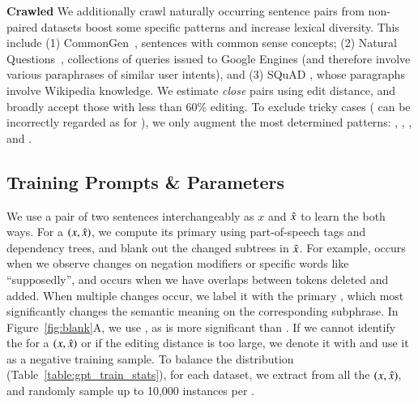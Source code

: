 \textbf{Crawled} 
We additionally crawl naturally occurring sentence pairs from non-paired datasets boost some specific patterns and increase lexical diversity. 
This include 
(1) CommonGen~\cite{lin-etal-2020-commongen}, sentences with common sense concepts; 
(2) Natural Questions~\cite{kwiatkowski-etal-2019-natural}, collections of queries issued to Google Engines (and therefore involve various paraphrases of similar user intents), and 
(3) SQuAD \cite{rajpurkar-etal-2016-squad}, whose paragraphs involve Wikipedia knowledge.
We estimate \emph{close} pairs using edit distance, and broadly accept those with less than 60\% editing.
To exclude tricky cases (\eg {} can be incorrectly regarded as  for ), we only augment the most determined patterns: , , , and .


\subsection{Training Prompts \& Parameters}

We use a pair of two sentences interchangeably as $x$ and $\hat{x}$ to learn the \tagstrs both ways.
For a $(x, \hat{x})$, we compute its primary \tagstr using part-of-speech tags and dependency trees, and blank out the changed subtrees in $\hat{x}$.
For example,  occurs when we observe changes on negation modifiers or specific words like ``supposedly'', and  occurs when we have overlaps between tokens deleted and added.
When multiple changes occur, we label it with the primary \tagstr, which most significantly changes the semantic meaning on the corresponding subphrase.
In Figure~\ref{fig:blank}A, we use , as  is more significant than .
If we cannot identify the \tagstr for a $(x, \hat{x})$ or if the editing distance is too large, we denote it with  and use it as a negative training sample.
To balance the distribution (Table~\ref{table:gpt_train_stats}), for each dataset, we extract \tagstrs from all the $(x, \hat{x})$, and randomly sample up to 10,000 instances per \tagstrshorts.

